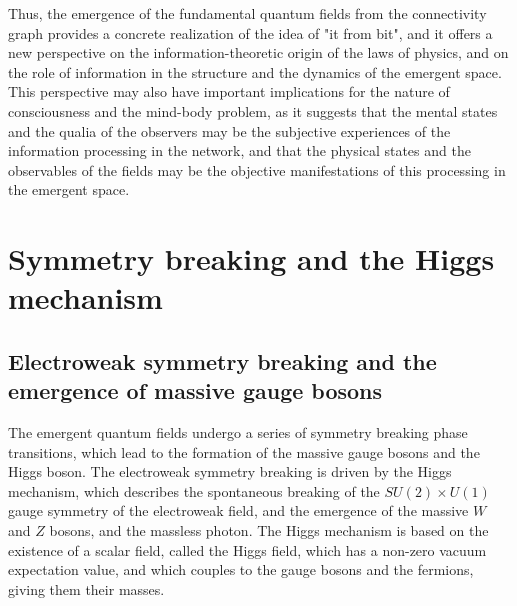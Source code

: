 \begin{tcolorbox}[colback=green!5!white,colframe=green!75!black,title=Question]
Thus, the emergence of the fundamental quantum fields from the connectivity graph provides a concrete realization of the idea of "it from bit", and it offers a new perspective on the information-theoretic origin of the laws of physics, and on the role of information in the structure and the dynamics of the emergent space. This perspective may also have important implications for the nature of consciousness and the mind-body problem, as it suggests that the mental states and the qualia of the observers may be the subjective experiences of the information processing in the network, and that the physical states and the observables of the fields may be the objective manifestations of this processing in the emergent space.
\end{tcolorbox}

\section{Symmetry breaking and the Higgs mechanism}
\subsection{Electroweak symmetry breaking and the emergence of massive gauge bosons}
The emergent quantum fields undergo a series of symmetry breaking phase transitions, which lead to the formation of the massive gauge bosons and the Higgs boson. The electroweak symmetry breaking is driven by the Higgs mechanism, which describes the spontaneous breaking of the $SU(2) \times U(1)$ gauge symmetry of the electroweak field, and the emergence of the massive $W$ and $Z$ bosons, and the massless photon. The Higgs mechanism is based on the existence of a scalar field, called the Higgs field, which has a non-zero vacuum expectation value, and which couples to the gauge bosons and the fermions, giving them their masses.

